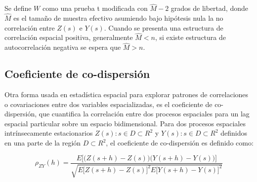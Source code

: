 \documentclass[11pt,b5paper,]{krantz}
\begin{document}
Se define \(W\) como una prueba t modificada con \(\hat{M}-2\) grados de libertad, donde \(\hat{M}\) es el tamaño de muestra efectivo asumiendo bajo hipótesis nula la no correlación entre \(Z(s)\) e \(Y(s)\). Cuando se presenta una estructura de correlación espacial positiva, generalmente \(\hat{M} < n\), si existe estructura de autocorrelación negativa se espera que \(\hat{M} > n\).

\hypertarget{coeficiente-de-co-dispersiuxf3n}{%
\subsection{Coeficiente de co-dispersión}\label{coeficiente-de-co-dispersiuxf3n}}

Otra forma usada en estadística espacial para explorar patrones de correlaciones o covariaciones entre dos variables espacializadas, es el coeficiente de co-dispersión, que cuantifica la correlación entre dos procesos espaciales para un lag espacial particular sobre un espacio bidimensional. Para dos procesos espaciales intrínsecamente estacionarios \({Z(s):s\in D\subset R^2}\) y \({Y(s):s\in D\subset R^2}\) definidos en una parte de la región \(D\subset R^2\), el coeficiente de co-dispersión es definido como:

\[\rho_{ZY}(h)= \frac{E \Big[ \big(Z(s+h)-Z(s) \big) \big(Y(s+h)-Y(s) \big) \Big]}{\sqrt{E \big[Z(s+h)-Z(s) \big]^2 E \big[Y(s+h)-Y(s) \big]^2}}\]
\end{document}
